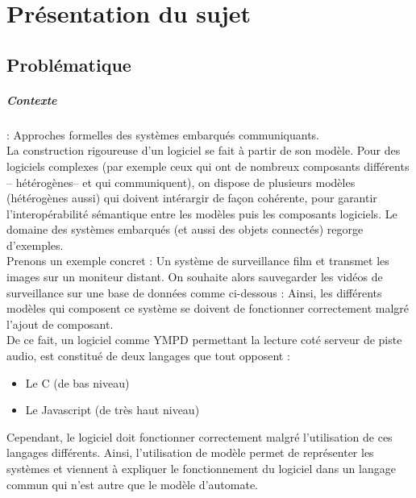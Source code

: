 \documentclass[12pt,a4paper]{report}
\begin{document}
\chapter{Présentation du sujet}


\section{Problématique}



\paragraph*{Contexte}: Approches formelles des systèmes embarqués communiquants.\\

La construction rigoureuse d'un logiciel se fait à partir de son modèle. Pour des 
logiciels complexes (par exemple ceux qui ont de nombreux composants différents -- 
hétérogènes-- et qui communiquent), on dispose de plusieurs modèles (hétérogènes 
aussi) qui doivent intérargir de façon cohérente, pour garantir l'interopérabilité 
sémantique entre les modèles puis les composants logiciels. Le domaine des systèmes 
embarqués (et aussi des objets connectés) regorge d'exemples.\\

Prenons un exemple concret : 
Un système de surveillance film et transmet les images sur un moniteur distant.
On souhaite alors sauvegarder les vidéos de surveillance sur une base de données comme ci-dessous :
Ainsi, les différents modèles qui composent ce système se doivent de fonctionner correctement malgré l'ajout de composant.\\




De ce fait, un logiciel comme YMPD permettant la lecture coté serveur de piste audio, est constitué de deux langages que tout opposent : \begin{itemize}
  \item Le C (de bas niveau)
  \item Le Javascript (de très haut niveau)
\end{itemize}
Cependant, le logiciel doit fonctionner correctement malgré l'utilisation de ces langages différents. Ainsi, l'utilisation de modèle permet de représenter les systèmes et viennent à expliquer le fonctionnement du logiciel dans un langage commun qui n'est autre que le modèle d'automate.
\end{document}
